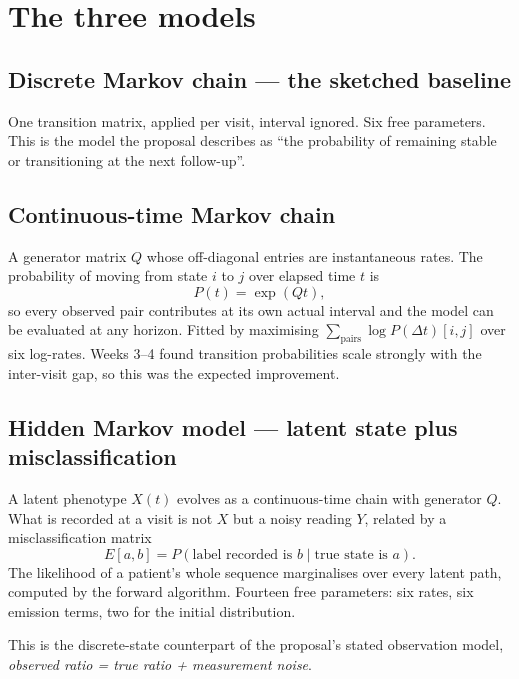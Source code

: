 \documentclass[11pt,a4paper]{article}
\begin{document}
\section{The three models}

\subsection{Discrete Markov chain --- the sketched baseline}

One transition matrix, applied per visit, interval ignored. Six free
parameters. This is the model the proposal describes as ``the probability of
remaining stable or transitioning at the next follow-up''.

\subsection{Continuous-time Markov chain}

A generator matrix $Q$ whose off-diagonal entries are instantaneous rates. The
probability of moving from state $i$ to $j$ over elapsed time $t$ is
\[
  P(t) = \exp(Qt),
\]
so every observed pair contributes at its own actual interval and the model can
be evaluated at any horizon. Fitted by maximising
$\sum_{\text{pairs}} \log P(\Delta t)[i, j]$ over six log-rates. Weeks 3--4
found transition probabilities scale strongly with the inter-visit gap, so this
was the expected improvement.

\subsection{Hidden Markov model --- latent state plus misclassification}

A latent phenotype $X(t)$ evolves as a continuous-time chain with generator
$Q$. What is recorded at a visit is not $X$ but a noisy reading $Y$, related by
a misclassification matrix
\[
  E[a, b] = P(\text{label recorded is } b \mid \text{true state is } a).
\]
The likelihood of a patient's whole sequence marginalises over every latent
path, computed by the forward algorithm. Fourteen free parameters: six rates,
six emission terms, two for the initial distribution.

This is the discrete-state counterpart of the proposal's stated observation
model, \emph{observed ratio = true ratio + measurement noise}.
\end{document}
